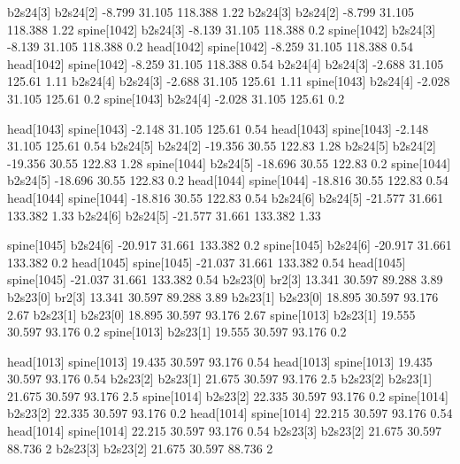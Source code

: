 b2s24[3]    b2s24[2]    -8.799    31.105    118.388    1.22
b2s24[3]    b2s24[2]    -8.799    31.105    118.388    1.22
spine[1042]    b2s24[3]    -8.139    31.105    118.388    0.2
spine[1042]    b2s24[3]    -8.139    31.105    118.388    0.2
head[1042]    spine[1042]    -8.259    31.105    118.388    0.54
head[1042]    spine[1042]    -8.259    31.105    118.388    0.54
b2s24[4]    b2s24[3]    -2.688    31.105    125.61    1.11
b2s24[4]    b2s24[3]    -2.688    31.105    125.61    1.11
spine[1043]    b2s24[4]    -2.028    31.105    125.61    0.2
spine[1043]    b2s24[4]    -2.028    31.105    125.61    0.2


head[1043]    spine[1043]    -2.148    31.105    125.61    0.54
head[1043]    spine[1043]    -2.148    31.105    125.61    0.54
b2s24[5]    b2s24[2]    -19.356    30.55    122.83    1.28
b2s24[5]    b2s24[2]    -19.356    30.55    122.83    1.28
spine[1044]    b2s24[5]    -18.696    30.55    122.83    0.2
spine[1044]    b2s24[5]    -18.696    30.55    122.83    0.2
head[1044]    spine[1044]    -18.816    30.55    122.83    0.54
head[1044]    spine[1044]    -18.816    30.55    122.83    0.54
b2s24[6]    b2s24[5]    -21.577    31.661    133.382    1.33
b2s24[6]    b2s24[5]    -21.577    31.661    133.382    1.33


spine[1045]    b2s24[6]    -20.917    31.661    133.382    0.2
spine[1045]    b2s24[6]    -20.917    31.661    133.382    0.2
head[1045]    spine[1045]    -21.037    31.661    133.382    0.54
head[1045]    spine[1045]    -21.037    31.661    133.382    0.54
b2s23[0]    br2[3]    13.341    30.597    89.288    3.89
b2s23[0]    br2[3]    13.341    30.597    89.288    3.89
b2s23[1]    b2s23[0]    18.895    30.597    93.176    2.67
b2s23[1]    b2s23[0]    18.895    30.597    93.176    2.67
spine[1013]    b2s23[1]    19.555    30.597    93.176    0.2
spine[1013]    b2s23[1]    19.555    30.597    93.176    0.2


head[1013]    spine[1013]    19.435    30.597    93.176    0.54
head[1013]    spine[1013]    19.435    30.597    93.176    0.54
b2s23[2]    b2s23[1]    21.675    30.597    93.176    2.5
b2s23[2]    b2s23[1]    21.675    30.597    93.176    2.5
spine[1014]    b2s23[2]    22.335    30.597    93.176    0.2
spine[1014]    b2s23[2]    22.335    30.597    93.176    0.2
head[1014]    spine[1014]    22.215    30.597    93.176    0.54
head[1014]    spine[1014]    22.215    30.597    93.176    0.54
b2s23[3]    b2s23[2]    21.675    30.597    88.736    2
b2s23[3]    b2s23[2]    21.675    30.597    88.736    2


